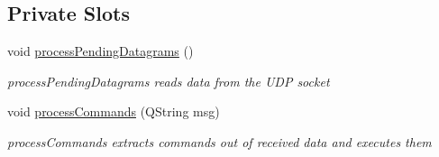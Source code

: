 \subsection*{Private Slots}
\begin{DoxyCompactItemize}
\item 
\mbox{\label{classUDPlistener_ac971ee184440cfc88ff260db8ca3a2ca}} 
void \hyperlink{classUDPlistener_ac971ee184440cfc88ff260db8ca3a2ca}{process\+Pending\+Datagrams} ()
\begin{DoxyCompactList}\small\item\em process\+Pending\+Datagrams reads data from the U\+DP socket \end{DoxyCompactList}\item 
void \hyperlink{classUDPlistener_a86e1147a1adf1a32ae49d43529cd53f1}{process\+Commands} (Q\+String msg)
\begin{DoxyCompactList}\small\item\em process\+Commands extracts commands out of received data and executes them \end{DoxyCompactList}\end{DoxyCompactItemize}
